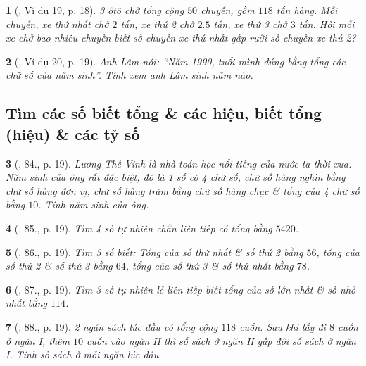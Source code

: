 \documentclass{article}
\newtheorem{baitoan}{}
\begin{document}
\begin{baitoan}[\cite{Binh_Toan_6_tap_1}, Ví dụ 19, p. 18]
	3 ôtô chở tổng cộng $50$ chuyến, gồm $118$ tấn hàng. Mỗi chuyến, xe thứ nhất chở $2$ tấn, xe thứ 2 chở $2.5$ tấn, xe thứ 3 chở $3$ tấn. Hỏi mỗi xe chở bao nhiêu chuyến biết số chuyến xe thứ nhất gấp rưỡi số chuyến xe thứ 2?
\end{baitoan}

\begin{baitoan}[\cite{Binh_Toan_6_tap_1}, Ví dụ 20, p. 19]
	Anh Lâm nói: ``Năm 1990, tuổi mình đúng bằng tổng các chữ số của năm sinh''. Tính xem anh Lâm sinh năm nào.
\end{baitoan}

\subsection{Tìm các số biết tổng \& các hiệu, biết tổng (hiệu) \& các tỷ số}

\begin{baitoan}[\cite{Binh_Toan_6_tap_1}, 84., p. 19]
	Lương Thế Vinh là nhà toán học nổi tiếng của nước ta thời xưa. Năm sinh của ông rất đặc biệt, đó là 1 số có 4 chữ số, chữ số hàng nghìn bằng chữ số hàng đơn vị, chữ số hàng trăm bằng chữ số hàng chục \& tổng của 4 chữ số bằng $10$. Tính năm sinh của ông.
\end{baitoan}

\begin{baitoan}[\cite{Binh_Toan_6_tap_1}, 85., p. 19]
	Tìm 4 số tự nhiên chẵn liên tiếp có tổng bằng $5420$.
\end{baitoan}

\begin{baitoan}[\cite{Binh_Toan_6_tap_1}, 86., p. 19]
	Tìm 3 số biết: Tổng của số thứ nhất \& số thứ 2 bằng $56$, tổng của số thứ 2 \& số thứ 3 bằng $64$, tổng của số thứ 3 \& số thứ nhất bằng $78$.
\end{baitoan}

\begin{baitoan}[\cite{Binh_Toan_6_tap_1}, 87., p. 19]
	Tìm 3 số tự nhiên lẻ liên tiếp biết tổng của số lớn nhất \& số nhỏ nhất bằng $114$.
\end{baitoan}

\begin{baitoan}[\cite{Binh_Toan_6_tap_1}, 88., p. 19]
	2 ngăn sách lúc đầu có tổng cộng $118$ cuốn. Sau khi lấy đi $8$ cuốn ở ngăn {\rm I}, thêm $10$ cuốn vào ngăn {\rm II} thì số sách ở ngăn {\rm II} gấp đôi số sách ở ngăn {\rm I}. Tính số sách ở mỗi ngăn lúc đầu.
\end{baitoan}
\end{document}
